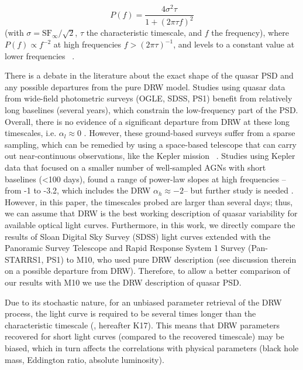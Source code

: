 \documentclass[twocolumn]{aastex62}
\begin{document}
\begin{equation}
	P(f) = \frac{4\sigma^{2}\tau}{1+(2 \pi \tau f)^{2}}
\end{equation}
(with $\sigma = \mathrm{SF}_{\infty} / \sqrt{2}$, $\tau$ the characteristic timescale, and $f$ the frequency), where $P(f) \propto f^{-2}$  at high frequencies $f > (2\pi \tau)^{-1}$, and levels to a constant value at lower frequencies ~\citep{kelly2014}. 

There is a debate in the literature about the exact shape of the quasar PSD and any possible  departures from the pure DRW model. Studies using quasar data from wide-field photometric surveys (OGLE, SDSS, PS1) benefit from relatively long baselines (several years), which constrain the low-frequency part of the PSD. Overall, there is no evidence of a significant departure from DRW at these long timescales, i.e. $\alpha_{l} \approx 0$ \citep{zu2013, simm2016, kozlowski2016b, caplar2017, guo2017, sun2018}. However, these ground-based surveys suffer from a sparse sampling, which can be remedied by using a space-based telescope that can carry out near-continuous observations, like the Kepler mission ~\citep{borucki2010}. Studies using Kepler data that focused on a smaller number of well-sampled AGNs with short baselines (<100 days), found a range of power-law slopes at high frequencies -- from -1 to -3.2, which includes the DRW $\alpha_{h} \approx -2$-- but further study is needed \citep{mushotzky2011,edelson2014,aranzana2018,smith2018}. However, in this paper, the timescales probed are larger than several days; thus, we can assume that DRW is the best working description of quasar variability for available optical light curves. Furthermore, in this work, we directly compare the results of Sloan Digital Sky Survey (SDSS) light curves extended with the Panoramic Survey Telescope and Rapid Response System 1 Survey (Pan-STARRS1, PS1) to M10, who used pure DRW description (see discussion therein on a possible departure from DRW). Therefore, to allow a better comparison of our results with M10 we  use the DRW description of quasar PSD. 

Due to its stochastic nature, for an unbiased parameter retrieval of the DRW process, the light curve is required to be several times longer than the characteristic timescale (\citealt{kozlowski2010, kozlowski2017a}, hereafter K17). This means that DRW parameters recovered for short light curves (compared to the recovered timescale) may be biased, which in turn affects the correlations with physical parameters (black hole mass, Eddington ratio, absolute luminosity). 
\end{document}
